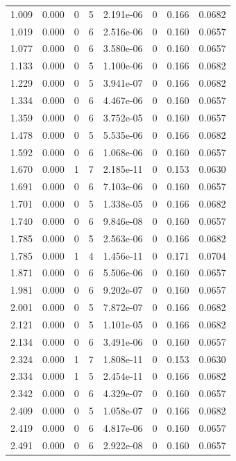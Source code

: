 \documentclass[preview]{standalone}
\begin{document}
{{\begin{tabular}{L{1.2cm}C{1.2cm} C{0.3cm}C{0.5cm} C{1.4cm}C{1.4cm} C{1.4cm}C{1.4cm}}
  1.009  &  0.000  & 0     &  5 &  2.191e-06  & 0  & 0.166 &  0.0682   \\ 
  1.019  &  0.000  & 0     &  6 &  2.516e-06  & 0  & 0.160 &  0.0657   \\ 
  1.077  &  0.000  & 0     &  6 &  3.580e-06  & 0  & 0.160 &  0.0657   \\ 
  1.133  &  0.000  & 0     &  5 &  1.100e-06  & 0  & 0.166 &  0.0682   \\ 
  1.229  &  0.000  & 0     &  5 &  3.941e-07  & 0  & 0.166 &  0.0682   \\ 
  1.334  &  0.000  & 0     &  6 &  4.467e-06  & 0  & 0.160 &  0.0657   \\ 
  1.359  &  0.000  & 0     &  6 &  3.752e-05  & 0  & 0.160 &  0.0657   \\ 
  1.478  &  0.000  & 0     &  5 &  5.535e-06  & 0  & 0.166 &  0.0682   \\ 
  1.592  &  0.000  & 0     &  6 &  1.068e-06  & 0  & 0.160 &  0.0657   \\ 
  1.670  &  0.000  & 1     &  7 &  2.185e-11  & 0  & 0.153 &  0.0630   \\ 
  1.691  &  0.000  & 0     &  6 &  7.103e-06  & 0  & 0.160 &  0.0657   \\ 
  1.701  &  0.000  & 0     &  5 &  1.338e-05  & 0  & 0.166 &  0.0682   \\ 
  1.740  &  0.000  & 0     &  6 &  9.846e-08  & 0  & 0.160 &  0.0657   \\ 
  1.785  &  0.000  & 0     &  5 &  2.563e-06  & 0  & 0.166 &  0.0682   \\ 
  1.785  &  0.000  & 1     &  4 &  1.456e-11  & 0  & 0.171 &  0.0704   \\ 
  1.871  &  0.000  & 0     &  6 &  5.506e-06  & 0  & 0.160 &  0.0657   \\ 
  1.981  &  0.000  & 0     &  6 &  9.202e-07  & 0  & 0.160 &  0.0657   \\ 
  2.001  &  0.000  & 0     &  5 &  7.872e-07  & 0  & 0.166 &  0.0682   \\ 
  2.121  &  0.000  & 0     &  5 &  1.101e-05  & 0  & 0.166 &  0.0682   \\ 
  2.134  &  0.000  & 0     &  6 &  3.491e-06  & 0  & 0.160 &  0.0657   \\ 
  2.324  &  0.000  & 1     &  7 &  1.808e-11  & 0  & 0.153 &  0.0630   \\ 
  2.334  &  0.000  & 1     &  5 &  2.454e-11  & 0  & 0.166 &  0.0682   \\ 
  2.342  &  0.000  & 0     &  6 &  4.329e-07  & 0  & 0.160 &  0.0657   \\ 
  2.409  &  0.000  & 0     &  5 &  1.058e-07  & 0  & 0.166 &  0.0682   \\ 
  2.419  &  0.000  & 0     &  6 &  4.817e-06  & 0  & 0.160 &  0.0657   \\ 
  2.491  &  0.000  & 0     &  6 &  2.922e-08  & 0  & 0.160 &  0.0657   \\ 
\hline 
\end{tabular} 

}}
\end{document}
